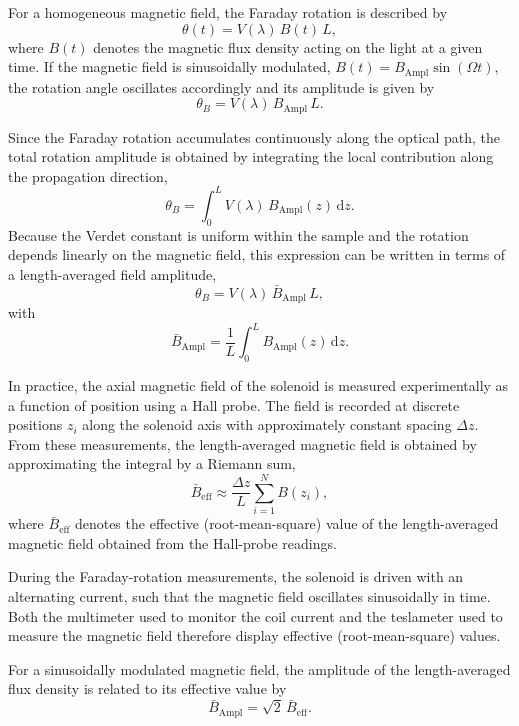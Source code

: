 \documentclass[a4paper]{article}
\begin{document}
For a homogeneous magnetic field, the Faraday rotation is described by
\[
  \theta(t) = V(\lambda)\, B(t)\, L,
\]
where $B(t)$ denotes the magnetic flux density acting on the light at a given time.
If the magnetic field is sinusoidally modulated, $B(t) = B_{\mathrm{Ampl}} \sin(\Omega t)$, the rotation angle oscillates accordingly and its amplitude is given by
\[
  \theta_B = V(\lambda)\, B_{\mathrm{Ampl}}\,L.
\]

Since the Faraday rotation accumulates continuously along the optical path, the total rotation amplitude is obtained by integrating the local contribution along the propagation direction,
\[
  \theta_B = \int_0^L V(\lambda)\, B_{\mathrm{Ampl}}(z)\,\mathrm{d}z.
\]
Because the Verdet constant is uniform within the sample and the rotation depends linearly on the magnetic field, this expression can be written in terms of a length-averaged field amplitude,
\[
  \theta_B = V(\lambda)\,\bar B_{\mathrm{Ampl}}\,L,
\]
with
\[
  \bar B_{\mathrm{Ampl}} = \frac{1}{L}\int_0^L B_{\mathrm{Ampl}}(z)\,\mathrm{d}z.
\]

In practice, the axial magnetic field of the solenoid is measured experimentally as a function of position using a Hall probe.
The field is recorded at discrete positions $z_i$ along the solenoid axis with approximately constant spacing $\Delta z$.
From these measurements, the length-averaged magnetic field is obtained by approximating the integral by a Riemann sum,
\begin{equation}
  \bar B_{\mathrm{eff}} \approx \frac{\Delta z}{L} \sum_{i=1}^{N} B(z_i),
  \label{eq:Bavg_discrete}
\end{equation}
where $\bar B_{\mathrm{eff}}$ denotes the effective (root-mean-square) value of the length-averaged magnetic field obtained from the Hall-probe readings.

During the Faraday-rotation measurements, the solenoid is driven with an alternating current, such that the magnetic field oscillates sinusoidally in time.
Both the multimeter used to monitor the coil current and the teslameter used to measure the magnetic field therefore display effective (root-mean-square) values.

For a sinusoidally modulated magnetic field, the amplitude of the length-averaged flux density is related to its effective value by
\begin{equation}
  \bar B_{\mathrm{Ampl}} = \sqrt{2}\,\bar B_{\mathrm{eff}}.
  \label{eq:B_amplitude}
\end{equation}
\end{document}
